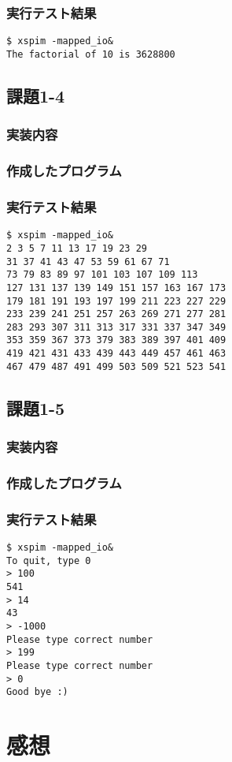 \documentclass[a4j,11pt]{jarticle}
\begin{document}
  \subsubsection{実行テスト結果}
\begin{verbatim}
$ xspim -mapped_io&
The factorial of 10 is 3628800
\end{verbatim}

 \subsection{課題1-4}
  \subsubsection{実装内容}
  \subsubsection{作成したプログラム}
   
   \subsubsection{実行テスト結果}
   \begin{verbatim}
$ xspim -mapped_io&
2 3 5 7 11 13 17 19 23 29 
31 37 41 43 47 53 59 61 67 71 
73 79 83 89 97 101 103 107 109 113 
127 131 137 139 149 151 157 163 167 173 
179 181 191 193 197 199 211 223 227 229 
233 239 241 251 257 263 269 271 277 281 
283 293 307 311 313 317 331 337 347 349 
353 359 367 373 379 383 389 397 401 409 
419 421 431 433 439 443 449 457 461 463 
467 479 487 491 499 503 509 521 523 541 
   \end{verbatim}

 \subsection{課題1-5}
  \subsubsection{実装内容}
  \subsubsection{作成したプログラム}
   
   \subsubsection{実行テスト結果}
   \begin{verbatim}
$ xspim -mapped_io&
To quit, type 0
> 100
541
> 14
43
> -1000
Please type correct number
> 199
Please type correct number
> 0
Good bye :)
   \end{verbatim}

\section{感想}
\end{document}
